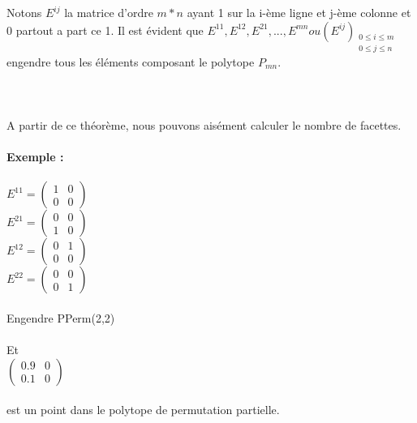 \documentclass{book}
\begin{document}
Notons $E^{ij}$ la matrice d'ordre $m*n$ ayant 1 sur la i-ème ligne et j-ème colonne et 0 partout a part ce 1. Il est évident que  $E^{11}, E^{12}, E^{21}, ..., E^{mn} ou (E^{ij})_{\substack {0\leqslant i \leqslant m\\0 \leqslant j \leqslant n}} $ engendre tous les éléments composant le polytope $P_{mn}$. \\\\ 
 \\\\
 A partir de ce théorème, nous pouvons aisément calculer le nombre de facettes.\\\\
 \textbf{Exemple :} \\\\
 $ E^{11}=\begin{pmatrix}
 1&0\\0&0
 \end{pmatrix} $ \\
 $ E^{21}=\begin{pmatrix}
 0&0\\1&0
 \end{pmatrix} $ \\
 $ E^{12}=\begin{pmatrix}
 0&1\\0&0
 \end{pmatrix} $\\
 $ E^{22}=\begin{pmatrix}
 0&0\\0&1
 \end{pmatrix} $\\\\
 Engendre PPerm(2,2)\\\\
 Et \\
 $\begin{pmatrix}
 0.9&0\\0.1&0
 \end{pmatrix} $\\\\ est un point dans le polytope de permutation partielle. \\\\
 
\end{document}

